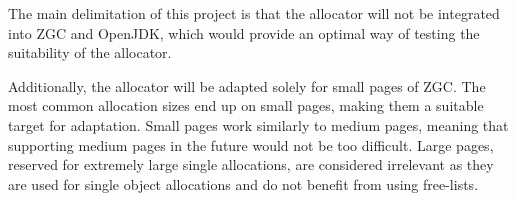 
The main delimitation of this project is that the allocator will not be integrated into ZGC and OpenJDK, which would provide an optimal way of testing the suitability of the allocator.

Additionally, the allocator will be adapted solely for small pages of ZGC. The most common allocation sizes end up on small pages, making them a suitable target for adaptation. Small pages work similarly to medium pages, meaning that supporting medium pages in the future would not be too difficult. Large pages, reserved for extremely large single allocations, are considered irrelevant as they are used for single object allocations and do not benefit from using free-lists.

